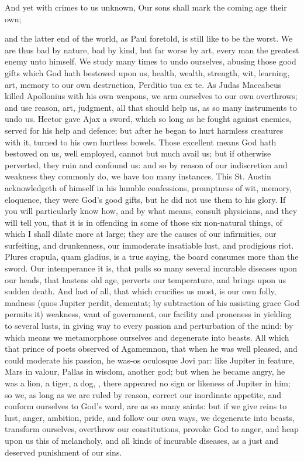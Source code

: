 {And yet with crimes to us unknown,
Our sons shall mark the coming age their own;

and the latter end of the world, as Paul foretold, is still like
to be the worst. We are thus bad by nature, bad by kind, but far worse
by art, every man the greatest enemy unto himself. We study many times
to undo ourselves, abusing those good gifts which God hath bestowed
upon us, health, wealth, strength, wit, learning, art, memory to our
own destruction, Perditio tua ex te. As Judas Maccabeus
killed Apollonius with his own weapons, we arm ourselves to our own
overthrows; and use reason, art, judgment, all that should help us, as
so many instruments to undo us. Hector gave Ajax a sword, which so long
as he fought against enemies, served for his help and defence; but
after he began to hurt harmless creatures with it, turned to his own
hurtless bowels. Those excellent means God hath bestowed on us, well
employed, cannot but much avail us; but if otherwise perverted, they
ruin and confound us: and so by reason of our indiscretion and weakness
they commonly do, we have too many instances. This St. Austin
acknowledgeth of himself in his humble confessions, promptness of wit,
memory, eloquence, they were God's good gifts, but he did not use them
to his glory. If you will particularly know how, and by what means,
consult physicians, and they will tell you, that it is in offending in
some of those six non-natural things, of which I shall dilate more
at large; they are the causes of our infirmities, our surfeiting, and
drunkenness, our immoderate insatiable lust, and prodigious riot.
Plures crapula, quam gladius, is a true saying, the board consumes more
than the sword. Our intemperance it is, that pulls so many several
incurable diseases upon our heads, that hastens old age, perverts
our temperature, and brings upon us sudden death. And last of all, that
which crucifies us most, is our own folly, madness (quos Jupiter
perdit, dementat; by subtraction of his assisting grace God permits it)
weakness, want of government, our facility and proneness in yielding to
several lusts, in giving way to every passion and perturbation of the
mind: by which means we metamorphose ourselves and degenerate into
beasts. All which that prince of poets observed of Agamemnon, that
when he was well pleased, and could moderate his passion, he was-os
oculosque Jovi par: like Jupiter in feature, Mars in valour, Pallas in
wisdom, another god; but when he became angry, he was a lion, a tiger,
a dog, \etc{}, there appeared no sign or likeness of Jupiter in him; so
we, as long as we are ruled by reason, correct our inordinate appetite,
and conform ourselves to God's word, are as so many saints: but if we
give reins to lust, anger, ambition, pride, and follow our own ways, we
degenerate into beasts, transform ourselves, overthrow our
constitutions, provoke God to anger, and heap upon us this of
melancholy, and all kinds of incurable diseases, as a just and deserved
punishment of our sins.

}
